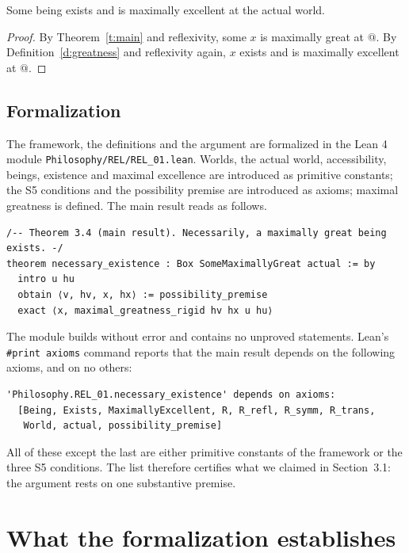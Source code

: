 \documentclass{situationist-preprint}
\begin{document}
\begin{corollary}\label{c:actual}
Some being exists and is maximally excellent at the actual world.
\end{corollary}

\begin{proof}
By Theorem~\ref{t:main} and reflexivity, some $x$ is maximally great at $@$. By Definition~\ref{d:greatness} and reflexivity again, $x$ exists and is maximally excellent at $@$.
\end{proof}

\subsection{Formalization}

The framework, the definitions and the argument are formalized in the Lean 4 module \nolinkurl{Philosophy/REL/REL_01.lean}. Worlds, the actual world, accessibility, beings, existence and maximal excellence are introduced as primitive constants; the S5 conditions and the possibility premise are introduced as axioms; maximal greatness is defined. The main result reads as follows.

\begin{lstlisting}
/-- Theorem 3.4 (main result). Necessarily, a maximally great being exists. -/
theorem necessary_existence : Box SomeMaximallyGreat actual := by
  intro u hu
  obtain ⟨v, hv, x, hx⟩ := possibility_premise
  exact ⟨x, maximal_greatness_rigid hv hx u hu⟩
\end{lstlisting}

The module builds without error and contains no unproved statements. Lean's \texttt{\#print axioms} command reports that the main result depends on the following axioms, and on no others:

\begin{lstlisting}
'Philosophy.REL_01.necessary_existence' depends on axioms:
  [Being, Exists, MaximallyExcellent, R, R_refl, R_symm, R_trans,
   World, actual, possibility_premise]
\end{lstlisting}

All of these except the last are either primitive constants of the framework or the three S5 conditions. The list therefore certifies what we claimed in Section~3.1: the argument rests on one substantive premise.

\section{What the formalization establishes}
\end{document}
